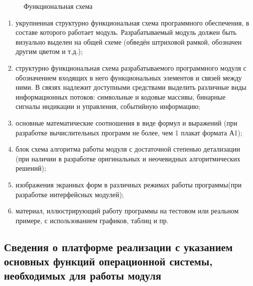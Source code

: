 \begin{figure}[ht]
\caption{Функциональная схема}
\label{pic:idef0}
\end{figure}

\begin{enumerate}
\item  укрупненная структурно функциональная схема программного обеспечения, в составе которого работает модуль. Разрабатываемый модуль должен быть визуально выделен на общей схеме (обведён штриховой рамкой, обозначен другим цветом и т.д.);
\item  структурно функциональная схема разрабатываемого программного модуля с обозначением входящих в него функциональных элементов и связей между ними. В связях надлежит доступными средствами выделить различные виды информационных потоков: символьные и кодовые массивы, бинарные сигналы индикации и управления, событийную информацию;
\item  основные математические соотношения в виде формул и выражений (при разработке вычислительных программ не более, чем 1 плакат формата А1);
\item  блок схема алгоритма работы модуля с достаточной степенью детализации (при наличии в разработке оригинальных и неочевидных алгоритмических решений);
\item  изображения экранных форм в различных режимах работы программы(при разработке интерфейсных модулей);
\item  материал, иллюстрирующий работу программы на тестовом или реальном примере, с использованием графиков, таблиц и пр.
\end{enumerate}

\subsection{Сведения о платформе реализации с указанием основных функций операционной системы, необходимых для работы модуля}


